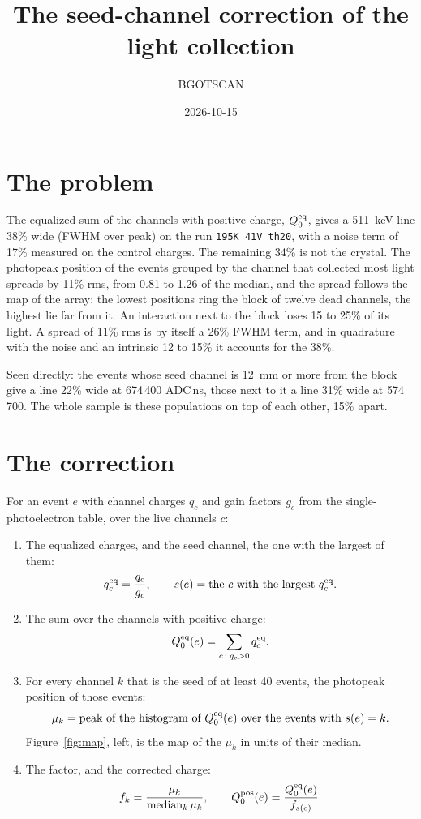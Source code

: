 \documentclass[11pt]{article}
\title{The seed-channel correction of the light collection}
\author{BGOTSCAN}
\date{2026-10-15}
\newcommand{\code}[1]{\texttt{#1}}
\begin{document}
\maketitle

\section{The problem}

The equalized sum of the channels with positive charge, $Q^{\rm eq}_0$,
gives a 511~keV line 38\% wide (FWHM over peak) on the run
\code{195K\_41V\_th20}, with a noise term of 17\% measured on the control
charges. The remaining 34\% is not the crystal. The photopeak position of
the events grouped by the channel that collected most light spreads by
11\% rms, from 0.81 to 1.26 of the median, and the spread follows the map
of the array: the lowest positions ring the block of twelve dead channels,
the highest lie far from it. An interaction next to the block loses 15 to
25\% of its light. A spread of 11\% rms is by itself a 26\% FWHM term, and
in quadrature with the noise and an intrinsic 12 to 15\% it accounts for
the 38\%.

Seen directly: the events whose seed channel is 12~mm or more from the
block give a line 22\% wide at 674\,400 ADC\,ns, those next to it a line
31\% wide at 574\,700. The whole sample is these populations on top of
each other, 15\% apart.

\section{The correction}

For an event $e$ with channel charges $q_c$ and gain factors $g_c$ from
the single-photoelectron table, over the live channels $c$:

\begin{enumerate}
\item The equalized charges, and the seed channel, the one with the
  largest of them:
  \[
    q^{\rm eq}_c = \frac{q_c}{g_c}, \qquad
    s(e) = \text{the } c \text{ with the largest } q^{\rm eq}_c .
  \]
\item The sum over the channels with positive charge:
  \[
    Q^{\rm eq}_0(e) = \sum_{c\,:\; q_c > 0} q^{\rm eq}_c .
  \]
\item For every channel $k$ that is the seed of at least 40 events, the
  photopeak position of those events:
  \[
    \mu_k = \text{peak of the histogram of } Q^{\rm eq}_0(e)
    \text{ over the events with } s(e) = k .
  \]
  Figure~\ref{fig:map}, left, is the map of the $\mu_k$ in units of
  their median.
\item The factor, and the corrected charge:
  \[
    f_k = \frac{\mu_k}{\operatorname{median}_k \mu_k}, \qquad
    Q^{\rm pos}_0(e) = \frac{Q^{\rm eq}_0(e)}{f_{s(e)}} .
  \]
\end{enumerate}
\end{document}
